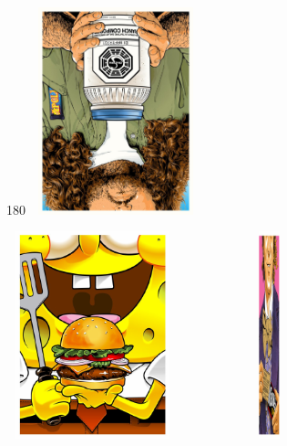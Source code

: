 \documentclass[12pt, a4paper]{article}
\begin{document}
\begin{figure}[h!]

	\begin{minipage}[h!]{0.3\linewidth} 
		\begin{turn}{180}
			\includegraphics[height=6cm, width=5cm]{pop10.pdf}
		\end{turn}
	\end{minipage}
	\hfill
	\begin{minipage}[h!]{0.3\linewidth}
		\includegraphics[height=6cm, width=5cm]{pop8.pdf}
	\end{minipage}
    \hfill
	\begin{minipage}[h!]{0.3\linewidth} 
		\includegraphics[height=6cm, width=5cm]{pop7.pdf}
	\end{minipage}
\end{figure}
\end{document}
